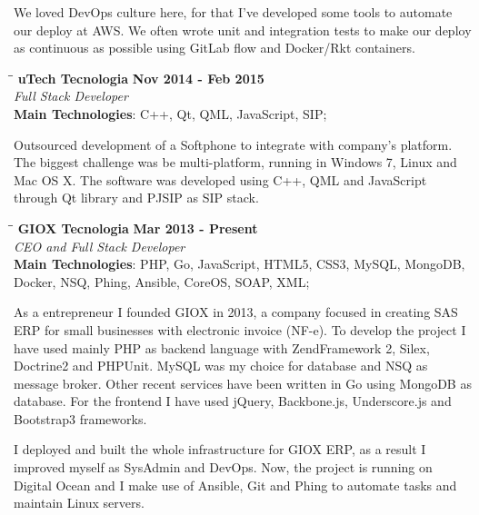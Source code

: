 \documentclass[margin]{res}
\begin{document}
\begin{resume}
We loved DevOps culture here, for that I've developed some tools to automate our deploy at AWS. We often wrote unit and integration tests to make our deploy as continuous as possible using GitLab flow and Docker/Rkt containers.

\newpage

\vspace{-0.1in}
    \begin{tabbing}
    \hspace{2.3in}\= \hspace{1.7in}\= \kill
    \textbf{uTech Tecnologia}    \>\>\textbf{Nov 2014 - Feb 2015}\\
    \textit{Full Stack Developer}\\
    \textbf{Main Technologies}: C++, Qt, QML, JavaScript, SIP;
    \end{tabbing}\vspace{-20pt}
    \vspace{2mm}
Outsourced development of a Softphone to integrate with company’s platform. The biggest challenge was be multi-platform, running in Windows 7, Linux and Mac OS X. The software was developed using C++, QML and JavaScript through Qt library and PJSIP as SIP stack.    

\vspace{-0.1in}
    \begin{tabbing}
    \hspace{2.3in}\= \hspace{1.7in}\= \kill
    \textbf{GIOX Tecnologia}    \>\>\textbf{Mar 2013 - Present}\\
    \textit{CEO and Full Stack Developer}\\
    \textbf{Main Technologies}: PHP, Go, JavaScript, HTML5, CSS3, MySQL, MongoDB,\\Docker, NSQ, Phing, Ansible, CoreOS, SOAP, XML;
    \end{tabbing}\vspace{-20pt}
    \vspace{2mm}
As a entrepreneur I founded GIOX in 2013, a company focused in creating SAS ERP for small businesses with electronic invoice (NF-e). To develop the project I have used mainly PHP as backend language with ZendFramework 2, Silex, Doctrine2 and PHPUnit. MySQL was my choice for database and NSQ as message broker. Other recent services have been written in Go using MongoDB as database. For the frontend I have used jQuery, Backbone.js, Underscore.js and Bootstrap3 frameworks.

I deployed and built the whole infrastructure for GIOX ERP, as a result I improved myself as SysAdmin and DevOps. Now, the project is running on Digital Ocean and I make use of Ansible, Git and Phing to automate tasks and maintain Linux servers.


\end{resume}
\end{document}
